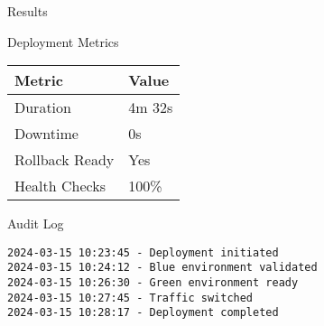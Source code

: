 \documentclass[presentation]{beamer}
\begin{document}
\begin{frame}[label={sec:orgd8f2258},fragile]{Results}
 \begin{block}{Deployment Metrics}
\begin{center}
\begin{tabular}{ll}
Metric & Value\\
\hline
Duration & 4m 32s\\
Downtime & 0s\\
Rollback Ready & Yes\\
Health Checks & 100\%\\
\end{tabular}
\end{center}
\end{block}
\begin{block}{Audit Log}
\begin{verbatim}
2024-03-15 10:23:45 - Deployment initiated
2024-03-15 10:24:12 - Blue environment validated
2024-03-15 10:26:30 - Green environment ready
2024-03-15 10:27:45 - Traffic switched
2024-03-15 10:28:17 - Deployment completed
\end{verbatim}
\end{block}
\end{frame}
\end{document}

